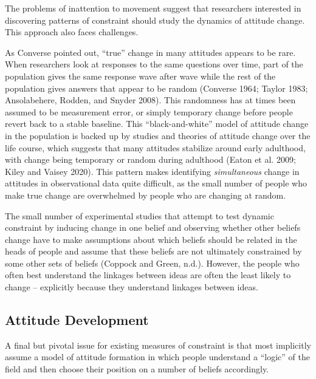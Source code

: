 \documentclass[12pt,]{article}
\begin{document}
The problems of inattention to movement suggest that researchers interested in discovering patterns of constraint should study the dynamics of attitude change. This approach also faces challenges.

As Converse pointed out, ``true'' change in many attitudes appears to be rare. When researchers look at responses to the same questions over time, part of the population gives the same response wave after wave while the rest of the population gives answers that appear to be random (Converse 1964; Taylor 1983; Ansolabehere, Rodden, and Snyder 2008). This randomness has at times been assumed to be measurement error, or simply temporary change before people revert back to a stable baseline. This ``black-and-white'' model of attitude change in the population is backed up by studies and theories of attitude change over the life course, which suggests that many attitudes stabilize around early adulthood, with change being temporary or random during adulthood (Eaton et al. 2009; Kiley and Vaisey 2020). This pattern makes identifying \emph{simultaneous} change in attitudes in observational data quite difficult, as the small number of people who make true change are overwhelmed by people who are changing at random.

The small number of experimental studies that attempt to test dynamic constraint by inducing change in one belief and observing whether other beliefs change have to make assumptions about which beliefs should be related in the heads of people and assume that these beliefs are not ultimately constrained by some other sets of beliefs (Coppock and Green, n.d.). However, the people who often best understand the linkages between ideas are often the least likely to change -- explicitly because they understand linkages between ideas.

\hypertarget{attitude-development}{%
\subsection{Attitude Development}\label{attitude-development}}

A final but pivotal issue for existing measures of constraint is that most implicitly assume a model of attitude formation in which people understand a ``logic'' of the field and then choose their position on a number of beliefs accordingly.
\end{document}
